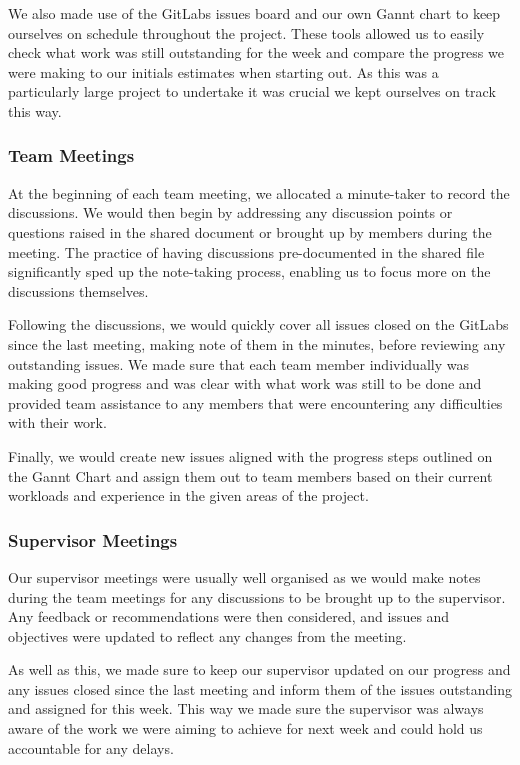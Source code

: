 \documentclass{article}
\begin{document}
We also made use of the GitLabs issues board and our own Gannt chart to keep ourselves on schedule throughout the project. These tools allowed us to easily check what work was still outstanding for the week and compare the progress we were making to our initials estimates when starting out. As this was a particularly large project to undertake it was crucial we kept ourselves on track this way.

\subsubsection{Team Meetings}
At the beginning of each team meeting, we allocated a minute-taker to record the discussions. We would then begin by addressing any discussion points or questions raised in the shared document or brought up by members during the meeting. The practice of having discussions pre-documented in the shared file significantly sped up the note-taking process, enabling us to focus more on the discussions themselves.

Following the discussions, we would quickly cover all issues closed on the GitLabs since the last meeting, making note of them in the minutes, before reviewing any outstanding issues. We made sure that each team member individually was making good progress and was clear with what work was still to be done and provided team assistance to any members that were encountering any difficulties with their work.

Finally, we would create new issues aligned with the progress steps outlined on the Gannt Chart and assign them out to team members based on their current workloads and experience in the given areas of the project.

\subsubsection{Supervisor Meetings}
Our supervisor meetings were usually well organised as we would make notes during the team meetings for any discussions to be brought up to the supervisor. Any feedback or recommendations were then considered, and issues and objectives were updated to reflect any changes from the meeting.

As well as this, we made sure to keep our supervisor updated on our progress and any issues closed since the last meeting and inform them of the issues outstanding and assigned for this week. This way we made sure the supervisor was always aware of the work we were aiming to achieve for next week and could hold us accountable for any delays.
\end{document}
